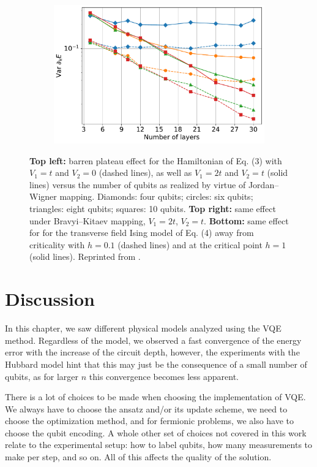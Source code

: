 \begin{figure}
\begin{subfigure}{.48\linewidth}
        \includegraphics[width=\textwidth]{figures/plateau_ising_both.pdf}
    \end{subfigure}
    \caption{\textbf{Top left:} barren plateau effect for the Hamiltonian of Eq. (3) with
    $V_1 = t$ and $V_2 = 0$ (dashed lines), as well as $V_1 = 2t$ and $V_2 = t$
    (solid lines) versus the number of qubits as realized by virtue of
    Jordan--Wigner mapping. Diamonds: four qubits; circles: six qubits;
    triangles: eight qubits; squares: 10 qubits. \textbf{Top right:} same effect under Bravyi--Kitaev mapping, $V_1 = 2t$, $V_2 = t$.
    \textbf{Bottom:} same effect for for the transverse field Ising model of Eq. (4) away from criticality with $h = 0.1$ (dashed lines) and at the critical point $h = 1$ (solid lines).    
    Reprinted from \cite{uvarov_variational_2020}.}
    \label{fig:plateaus_hubbard_ising}
\end{figure}


\section{Discussion}

In this chapter, we saw different physical models analyzed using the VQE method. Regardless of the model, we observed a fast convergence of the energy error with the increase of the circuit depth, however, the experiments with the Hubbard model hint that this may just be the consequence of a small number of qubits, as for larger $n$ this convergence becomes less apparent.

There is a lot of choices to be made when choosing the implementation of VQE. We always have to choose the ansatz and/or its update scheme, we need to choose the optimization method, and for fermionic problems, we also have to choose the qubit encoding. A whole other set of choices not covered in this work relate to the experimental setup: how to label qubits, how many measurements to make per step, and so on. All of this affects the quality of the solution.

